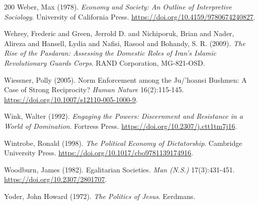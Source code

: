 \documentclass[11pt,letterpaper]{article}
\theoremstyle{definition}
\theoremstyle{remark}
\begin{document}
\begin{thebibliography}{200}
Weber, Max (1978). \emph{Economy and Society: An Outline of Interpretive Sociology}. University of California Press. \url{https://doi.org/10.4159/9780674240827}.

Wehrey, Frederic and Green, Jerrold D. and Nichiporuk, Brian and Nader, Alireza and Hansell, Lydia and Nafisi, Rasool and Bohandy, S. R. (2009). \emph{The Rise of the Pasdaran: Assessing the Domestic Roles of Iran's Islamic Revolutionary Guards Corps}. RAND Corporation, MG-821-OSD.

Wiessner, Polly (2005). Norm Enforcement among the Ju/'hoansi Bushmen: A Case of Strong Reciprocity? \emph{Human Nature} 16(2):115-145. \url{https://doi.org/10.1007/s12110-005-1000-9}.

Wink, Walter (1992). \emph{Engaging the Powers: Discernment and Resistance in a World of Domination}. Fortress Press. \url{https://doi.org/10.2307/j.ctt1tm7j16}.

Wintrobe, Ronald (1998). \emph{The Political Economy of Dictatorship}. Cambridge University Press. \url{https://doi.org/10.1017/cbo9781139174916}.

Woodburn, James (1982). Egalitarian Societies. \emph{Man (N.S.)} 17(3):431-451. \url{https://doi.org/10.2307/2801707}.

Yoder, John Howard (1972). \emph{The Politics of Jesus}. Eerdmans.

\end{thebibliography}
\end{document}

